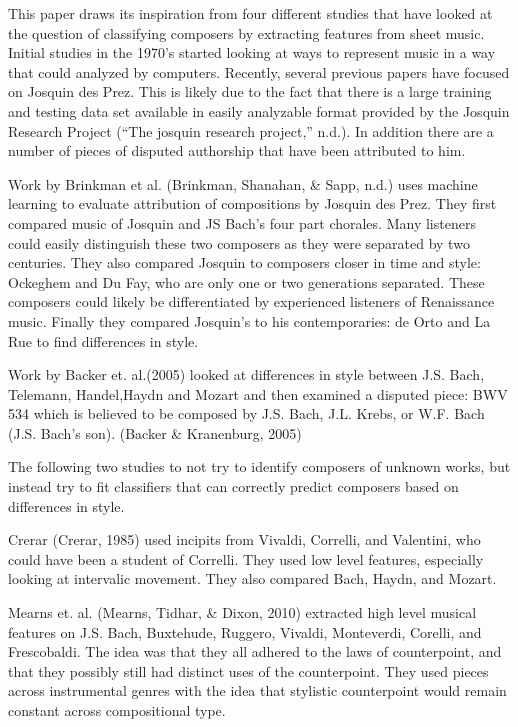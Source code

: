 \documentclass[12pt,twoside]{reedthesis}
\theoremstyle{definition}
\theoremstyle{definition}
\theoremstyle{definition}
\theoremstyle{remark}
\begin{document}
This paper draws its inspiration from four different studies that have
looked at the question of classifying composers by extracting features
from sheet music. Initial studies in the 1970's started looking at ways
to represent music in a way that could analyzed by computers. Recently,
several previous papers have focused on Josquin des Prez. This is likely
due to the fact that there is a large training and testing data set
available in easily analyzable format provided by the Josquin Research
Project (``The josquin research project,'' n.d.). In addition there are
a number of pieces of disputed authorship that have been attributed to
him.

Work by Brinkman et al. (Brinkman, Shanahan, \& Sapp, n.d.) uses machine
learning to evaluate attribution of compositions by Josquin des Prez.
They first compared music of Josquin and JS Bach's four part chorales.
Many listeners could easily distinguish these two composers as they were
separated by two centuries. They also compared Josquin to composers
closer in time and style: Ockeghem and Du Fay, who are only one or two
generations separated. These composers could likely be differentiated by
experienced listeners of Renaissance music. Finally they compared
Josquin's to his contemporaries: de Orto and La Rue to find differences
in style.

Work by Backer et. al.(2005) looked at differences in style between J.S.
Bach, Telemann, Handel,Haydn and Mozart and then examined a disputed
piece: BWV 534 which is believed to be composed by J.S. Bach, J.L.
Krebs, or W.F. Bach (J.S. Bach's son). (Backer \& Kranenburg, 2005)

The following two studies to not try to identify composers of unknown
works, but instead try to fit classifiers that can correctly predict
composers based on differences in style.

Crerar (Crerar, 1985) used incipits from Vivaldi, Correlli, and
Valentini, who could have been a student of Correlli. They used low
level features, especially looking at intervalic movement. They also
compared Bach, Haydn, and Mozart.

Mearns et. al. (Mearns, Tidhar, \& Dixon, 2010) extracted high level
musical features on J.S. Bach, Buxtehude, Ruggero, Vivaldi, Monteverdi,
Corelli, and Frescobaldi. The idea was that they all adhered to the laws
of counterpoint, and that they possibly still had distinct uses of the
counterpoint. They used pieces across instrumental genres with the idea
that stylistic counterpoint would remain constant across compositional
type.
\end{document}

